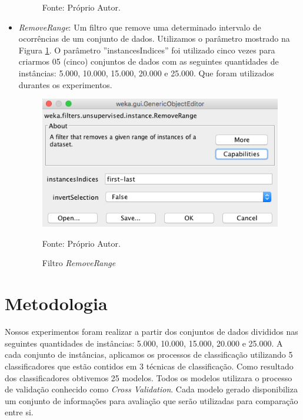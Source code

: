 \documentclass[
	12pt,				%
	openright,			%
	oneside,	
	a4paper,				%
	english,				%
	brazil				%
]{abntex2/abntex2} %
\begin{document}
\begin{itemize}
\begin{figure}[!h]
\begin{center}
				\end{center}
				\centering Fonte: Próprio Autor.
			\end{figure}
			\newpage
			\item \textit{RemoveRange}: Um filtro que remove uma determinado intervalo de ocorrências de um conjunto de dados. Utilizamos o parâmetro mostrado na Figura \ref{figfiltroRemoveRange}. O parâmetro ''instancesIndices''  foi utilizado cinco vezes para criarmos 05 (cinco) conjuntos de dados com as seguintes quantidades de instâncias: 5.000, 10.000, 15.000, 20.000 e 25.000. Que foram utilizados durantes os experimentos.
			\begin{figure}[!h]
					\caption{\label{figfiltroRemoveRange} Filtro \textit{RemoveRange}}
				\begin{center}
					\includegraphics[scale=0.45]{img/filtroRemoveRange.png}
				\end{center}
			\centering Fonte: Próprio Autor.
			\end{figure}
		\end{itemize}

		
	\section{Metodologia}
	
	Nossos experimentos foram realizar a partir dos conjuntos de dados divididos nas seguintes quantidades de instâncias: 5.000, 10.000, 15.000, 20.000 e 25.000. A cada conjunto de instâncias, aplicamos os processos de classificação utilizando 5 classificadores que estão contidos em 3 técnicas de classificação. Como resultado dos classificadores obtivemos 25 modelos. Todos os modelos utilizara o processo de validação conhecido como \textit{Cross Validation}. 
	Cada modelo gerado disponibiliza um conjunto de informações para avaliação que serão utilizadas para comparação entre si.
	
\end{document}
